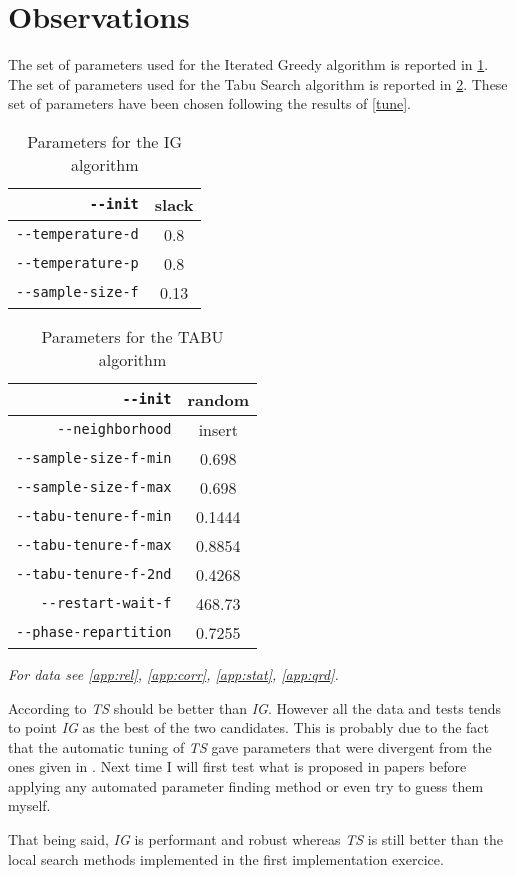\section{Observations}

The set of parameters used for the Iterated Greedy algorithm is reported in \ref{obs:table/ig-tune}. 
The set of parameters used for the Tabu Search algorithm is reported in \ref{obs:table/tabu-tune}. These set of parameters have been chosen following the results of \ref{tune}.


\begin{table}[H]
\begin{center}
\caption{Parameters for the IG algorithm}
\label{obs:table/ig-tune}
\begin{tabular}{|r|c|}
\hline
\verb!--init! & slack\\
\hline
\hline
\verb!--temperature-d! & 0.8\\
\hline
\verb!--temperature-p! & 0.8\\
\hline
\hline
\verb!--sample-size-f! & 0.13\\
\hline
\end{tabular}
\end{center}
\end{table}


\begin{table}[H]
\begin{center}
\caption{Parameters for the TABU algorithm}
\label{obs:table/tabu-tune}
\begin{tabular}{|r|c|}
\hline
\verb!--init! & random\\
\hline
\verb!--neighborhood! & insert\\
\hline
\hline
\verb!--sample-size-f-min! & 0.698\\
\hline
\verb!--sample-size-f-max! & 0.698\\
\hline
\hline
\verb!--tabu-tenure-f-min! & 0.1444\\
\hline
\verb!--tabu-tenure-f-max! & 0.8854\\
\hline
\verb!--tabu-tenure-f-2nd! & 0.4268\\
\hline
\hline
\verb!--restart-wait-f! & 468.73\\
\hline
\verb!--phase-repartition! & 0.7255\\
\hline
\end{tabular}
\end{center}
\end{table}


\emph{For data see \ref{app:rel},  \ref{app:corr}, \ref{app:stat}, \ref{app:qrd}.}


According to \cite{santostabu} \emph{TS} should be better than \emph{IG}.
However all the data and tests tends to point \emph{IG} as the best of the two candidates. This is probably due to the fact that the automatic tuning of \emph{TS} gave parameters that were divergent from the ones given in \cite{santostabu}. Next time I will first test what is proposed in papers before applying any automated parameter finding method or even try to guess them myself.

That being said, \emph{IG} is performant and robust whereas \emph{TS} is still better than the local search methods implemented in the first implementation exercice.